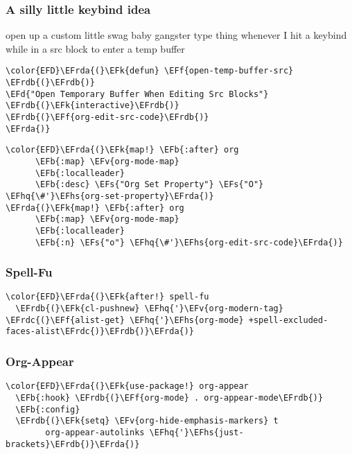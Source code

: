 \documentclass{article}
\newcommand{\EFs}[1]{\textcolor{EFs}{#1}} %
\newcommand{\EFd}[1]{\textcolor{EFd}{#1}} %
\newcommand{\EFk}[1]{\textcolor{EFk}{#1}} %
\newcommand{\EFb}[1]{\textcolor{EFb}{#1}} %
\newcommand{\EFf}[1]{\textcolor{EFf}{#1}} %
\newcommand{\EFv}[1]{\textcolor{EFv}{#1}} %
\newcommand{\EFhq}[1]{#1} %
\newcommand{\EFhs}[1]{\textcolor{EFhs}{#1}} %
\newcommand{\EFrda}[1]{\textcolor{EFrda}{#1}} %
\newcommand{\EFrdb}[1]{\textcolor{EFrdb}{#1}} %
\newcommand{\EFrdc}[1]{\textcolor{EFrdc}{#1}} %
\begin{document}
\subsubsection{A silly little keybind idea}
\label{sec:orge51c862}
open up a custom little swag baby gangster type thing whenever I hit a keybind while in a src block to enter a temp buffer
\begin{Code}
\begin{Verbatim}
\color{EFD}\EFrda{(}\EFk{defun} \EFf{open-temp-buffer-src} \EFrdb{(}\EFrdb{)}
\EFd{"Open Temporary Buffer When Editing Src Blocks"}
\EFrdb{(}\EFk{interactive}\EFrdb{)}
\EFrdb{(}\EFf{org-edit-src-code}\EFrdb{)}
\EFrda{)}
\end{Verbatim}
\end{Code}



\begin{Code}
\begin{Verbatim}
\color{EFD}\EFrda{(}\EFk{map!} \EFb{:after} org
      \EFb{:map} \EFv{org-mode-map}
      \EFb{:localleader}
      \EFb{:desc} \EFs{"Org Set Property"} \EFs{"O"} \EFhq{\#'}\EFhs{org-set-property}\EFrda{)}
\EFrda{(}\EFk{map!} \EFb{:after} org
      \EFb{:map} \EFv{org-mode-map}
      \EFb{:localleader}
      \EFb{:n} \EFs{"o"} \EFhq{\#'}\EFhs{org-edit-src-code}\EFrda{)}
\end{Verbatim}
\end{Code}

\subsubsection{Spell-Fu}
\label{sec:org9bf742f}
\begin{Code}
\begin{Verbatim}
\color{EFD}\EFrda{(}\EFk{after!} spell-fu
  \EFrdb{(}\EFk{cl-pushnew} \EFhq{'}\EFv{org-modern-tag} \EFrdc{(}\EFf{alist-get} \EFhq{'}\EFhs{org-mode} +spell-excluded-faces-alist\EFrdc{)}\EFrdb{)}\EFrda{)}
\end{Verbatim}
\end{Code}

\subsubsection{Org-Appear}
\label{sec:org2fd5705}
\begin{Code}
\begin{Verbatim}
\color{EFD}\EFrda{(}\EFk{use-package!} org-appear
  \EFb{:hook} \EFrdb{(}\EFf{org-mode} . org-appear-mode\EFrdb{)}
  \EFb{:config}
  \EFrdb{(}\EFk{setq} \EFv{org-hide-emphasis-markers} t
        org-appear-autolinks \EFhq{'}\EFhs{just-brackets}\EFrdb{)}\EFrda{)}
\end{Verbatim}
\end{Code}
\end{document}
